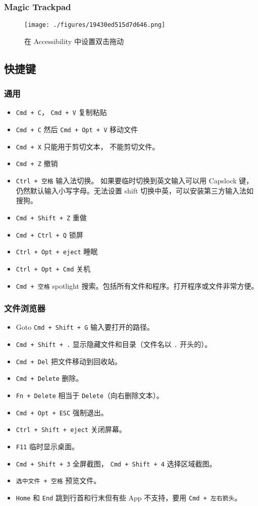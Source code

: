 \subsubsection{Magic Trackpad}
\begin{figure}[ht]
\centering
\texttt{[image: ./figures/19430ed515d7d646.png]}
\caption{在 Accessibility 中设置双击拖动} \label{fig_MacNt_1}
\end{figure}

\subsection{快捷键}

\subsubsection{通用}
\begin{itemize}
\item \verb`Cmd + C`， \verb`Cmd + V` 复制粘贴
\item \verb`Cmd + C` 然后 \verb`Cmd + Opt + V` 移动文件
\item \verb`Cmd + X` 只能用于剪切文本， 不能剪切文件。
\item \verb`Cmd + Z` 撤销
\item \verb`Ctrl + 空格` 输入法切换。 如果要临时切换到英文输入可以用 Capslock 键，仍然默认输入小写字母。无法设置 shift 切换中英，可以安装第三方输入法如搜狗。
\item \verb`Cmd + Shift + Z` 重做
\item \verb`Cmd + Ctrl + Q` 锁屏
\item \verb`Ctrl + Opt + eject` 睡眠
\item \verb`Ctrl + Opt + Cmd` 关机
\item \verb`Cmd + 空格` spotlight 搜索。包括所有文件和程序。打开程序或文件非常方便。
\end{itemize}


\subsubsection{文件浏览器}
\begin{itemize}
\item Goto \verb`Cmd + Shift + G` 输入要打开的路径。
\item \verb`Cmd + Shift + .` 显示隐藏文件和目录（文件名以 \verb`.` 开头的）。
\item \verb`Cmd + Del` 把文件移动到回收站。
\item \verb`Cmd + Delete` 删除。
\item \verb`Fn + Delete` 相当于 \verb`Delete`（向右删除文本）。
\item \verb`Cmd + Opt + ESC` 强制退出。
\item \verb`Ctrl + Shift + eject` 关闭屏幕。
\item \verb`F11` 临时显示桌面。
\item \verb`Cmd + Shift + 3` 全屏截图， \verb`Cmd + Shift + 4` 选择区域截图。
\item \verb`选中文件 + 空格` 预览文件。
\item \verb`Home` 和 \verb`End` 跳到行首和行末但有些 App 不支持，要用 \verb`Cmd + 左右箭头`。
\end{itemize}


